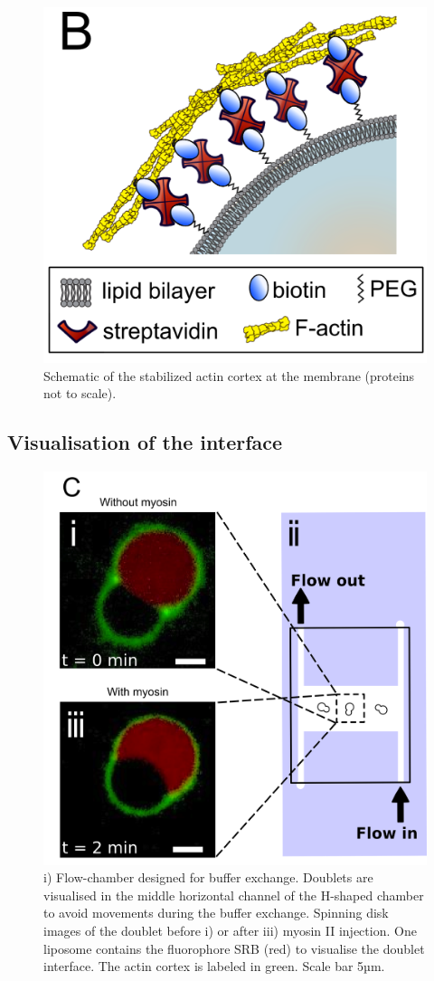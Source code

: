 \documentclass[A4paperpaper,11pt,english]{sphinxmanual}
\begin{document}
\begin{figure}[htbp]
\centering
\capstart

\includegraphics[width=0.500\linewidth]{Fig_01-B.png}
\caption{Schematic of the stabilized actin cortex at the membrane (proteins not to scale).}\label{index-latex:fig1b}\end{figure}


\subsection{Visualisation of the interface}
\label{index-latex:visualisation-of-the-interface}\begin{figure}[htbp]
\centering
\capstart

\includegraphics[width=0.500\linewidth]{Fig_01-C.png}
\caption{i) Flow-chamber designed for buffer exchange. Doublets
are visualised in the middle horizontal channel of the H-shaped chamber to
avoid movements during the buffer exchange. Spinning disk images of the
doublet before i) or after iii) myosin II injection. One liposome contains the fluorophore
SRB (red) to visualise the doublet interface. The actin cortex is
labeled in green. Scale bar 5µm.}\label{index-latex:fig1c}\end{figure}
\end{document}
